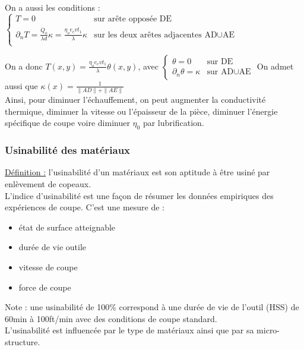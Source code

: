 \documentclass[../main.tex]{subfiles}
\begin{document}
On a aussi les conditions : $\begin{cases}
    T = 0 & \text{sur arête opposée DE}\\
    \partial_n T = \frac{\dot{Q}_o}{\lambda d}\kappa  = \frac{\eta_o e_c vt_1}{\lambda}\kappa& \text{sur les deux arêtes adjacentes AD}\cup \text{AE}\\
\end{cases}$

On a donc $T(x,y) = \frac{\eta_o e_c vt_1}{\lambda} \theta(x,y)$, avec $\begin{cases}
    \theta = 0 & \text{sur DE}\\
    \partial_n \theta = \kappa & \text{sur AD}\cup \text{AE}
\end{cases}$
On admet aussi que $\kappa(x) = \frac{1}{\parallel AD\parallel +\parallel AE\parallel}$\\

Ainsi, pour diminuer l'échauffement, on peut augmenter la conductivité thermique, diminuer la vitesse ou l'épaisseur de la pièce, diminuer l'énergie spécifique de coupe voire diminuer $\eta_0$ par lubrification.\\

\subsubsection{Usinabilité des matériaux}
\quad \underline{Définition :} l'usinabilité d'un matériaux est son aptitude à être usiné par enlèvement de copeaux.\\

L'indice d'usinabilité est une façon de résumer les données empiriques des expériences de coupe. C'est une mesure de : \begin{itemize}
    \item état de surface atteignable\\
    \item durée de vie outile\\
    \item vitesse de coupe\\
    \item force de coupe
\end{itemize}
\color{gray}Note : une usinabilité de 100\% correspond à une durée de vie de l'outil (HSS) de 60min à 100ft/min avec des conditions de coupe standard. \color{black}\\

L'usinabilité est influencée par le type de matériaux ainsi que par sa micro-structure.\\
\end{document}
